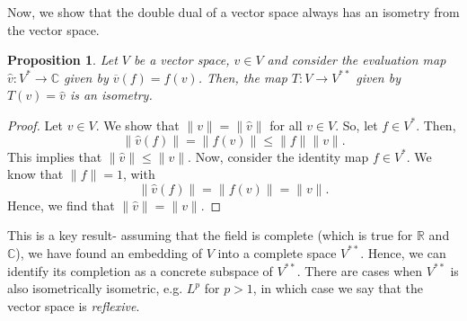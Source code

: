 \documentclass[a4paper, openany]{memoir}
\theoremstyle{definition}
\theoremstyle{plain}
\newtheorem{proposition}[definition]{Proposition}
\begin{document}
    Now, we show that the double dual of a vector space always has an isometry from the vector space.
    \begin{proposition}
        Let $V$ be a vector space, $v \in V$ and consider the evaluation map $\hat{v} \colon V^* \to \mathbb{C}$ given by $\overline{v}(f) = f(v)$. Then, the map $T \colon V \to V^{**}$ given by $T(v) = \hat{v}$ is an isometry.
    \end{proposition}
    \begin{proof}
        Let $v \in V$. We show that $\lVert v \rVert = \lVert \hat{v} \rVert$ for all $v \in V$. So, let $f \in V^*$. Then,
        \[\lVert \hat{v}(f) \rVert = \lVert f(v) \rVert \leq \lVert f \rVert \lVert v \rVert.\]
        This implies that $\lVert \hat{v} \rVert \leq \lVert v \rVert$. Now, consider the identity map $f \in V^*$. We know that $\lVert f \rVert = 1$, with 
        \[\lVert \hat{v}(f) \rVert = \lVert f(v) \rVert = \lVert v \rVert.\]
        Hence, we find that $\lVert \hat{v} \rVert = \lVert v \rVert$.
    \end{proof}
    \noindent This is a key result- assuming that the field is complete (which is true for $\mathbb{R}$ and $\mathbb{C}$), we have found an embedding of $V$ into a complete space $V^{**}$. Hence, we can identify its completion as a concrete subspace of $V^{**}$. There are cases when $V^{**}$ is also isometrically isometric, e.g. $L^p$ for $p > 1$, in which case we say that the vector space is \emph{reflexive}.
\end{document}
